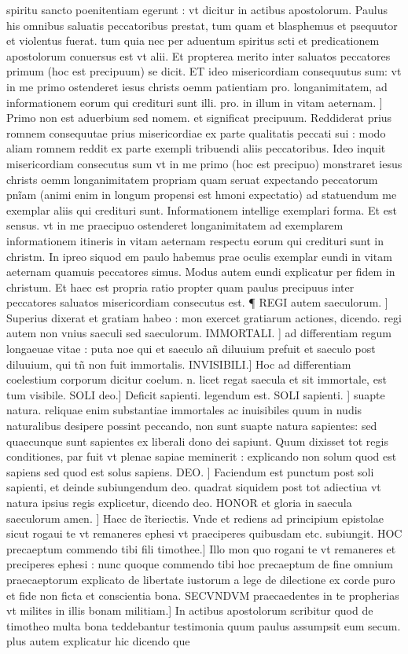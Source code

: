\documentclass{article}
\begin{document}
\begin{pages}
spiritu sancto poenitentiam egerunt : vt dicitur in actibus apostolorum. Paulus his omnibus saluatis peccatoribus prestat, tum quam et blasphemus et psequutor et violentus fuerat. tum quia nec per aduentum spiritus scti et predicationem apostolorum conuersus est vt alii. Et propterea merito inter saluatos peccatores primum (hoc est precipuum) se dicit. ET ideo misericordiam consequutus sum: vt in me primo ostenderet iesus christs oemm patientiam pro. longanimitatem, ad informationem eorum qui credituri sunt illi. pro. in illum in vitam aeternam. ] Primo non est aduerbium sed nomem. et significat precipuum. Reddiderat prius romnem consequutae prius misericordiae ex parte qualitatis peccati sui : modo aliam romnem reddit ex parte exempli tribuendi aliis peccatoribus. Ideo inquit misericordiam consecutus sum vt in me primo (hoc est precipuo) monstraret iesus christs oemm longanimitatem propriam quam seruat expectando peccatorum pnĩam (animi enim in longum propensi est hmoni expectatio) ad statuendum me exemplar aliis qui credituri sunt. Informationem intellige exemplari forma. Et est sensus. vt in me praecipuo ostenderet longanimitatem ad exemplarem informationem itineris in vitam aeternam respectu eorum qui credituri sunt in christm. In ipreo siquod em paulo habemus prae oculis exemplar eundi in vitam aeternam quamuis peccatores simus. Modus autem eundi explicatur per fidem in christum. Et haec est propria ratio propter quam paulus precipuus inter peccatores saluatos misericordiam consecutus est. ¶ REGI autem saeculorum. ] Superius dixerat et gratiam habeo : mon exercet gratiarum actiones, dicendo. regi autem non vnius saeculi sed saeculorum. IMMORTALI. ] ad differentiam regum longaeuae vitae : puta noe qui et saeculo añ diluuium prefuit et saeculo post diluuium, qui tñ non fuit immortalis. INVISIBILI.] Hoc ad differentiam coelestium corporum dicitur coelum. n. licet regat saecula et sit immortale, est tum visibile. SOLI deo.] Deficit sapienti. legendum est. SOLI sapienti. ] suapte natura. reliquae enim substantiae immortales ac inuisibiles quum in nudis naturalibus desipere possint peccando, non sunt suapte natura sapientes: sed quaecunque sunt sapientes ex liberali dono dei sapiunt. Quum dixisset tot regis conditiones, par fuit vt plenae sapiae meminerit : explicando non solum quod est sapiens sed quod est solus sapiens. DEO. ] Faciendum est punctum post soli sapienti, et deinde subiungendum deo. quadrat siquidem post tot adiectiua vt natura ipsius regis explicetur, dicendo deo. HONOR et gloria in saecula saeculorum amen. ] Haec de ĩteriectis. Vnde et rediens ad principium epistolae sicut rogaui te vt remaneres ephesi vt praeciperes quibusdam etc. subiungit. HOC precaeptum commendo tibi fili timothee.] Illo mon quo rogani te vt remaneres et preciperes ephesi : nunc quoque commendo tibi hoc precaeptum de fine omnium praecaeptorum explicato de libertate iustorum a lege de dilectione ex corde puro et fide non ficta et conscientia bona. SECVNDVM praecaedentes in te propherias vt milites in illis bonam militiam.] In actibus apostolorum scribitur quod de timotheo multa bona  \pend\pstart teddebantur testimonia quum paulus assumpsit eum secum. plus autem explicatur hic dicendo que   \pend
\marginpar{[ p.141 ]}

\end{pages}
\end{document}
